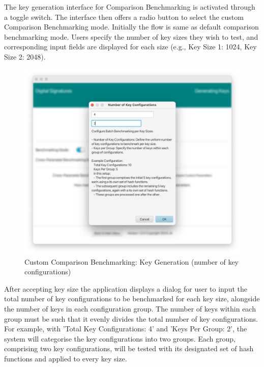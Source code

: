 \documentclass[]{final_report}
\begin{document}
The key generation interface for Comparison Benchmarking is activated through a toggle switch. The interface then offers a radio button to select the custom Comparison Benchmarking mode. Initially the flow is same as default comparison benchmarking mode. Users specify the number of key sizes they wish to test, and corresponding input fields are displayed for each size (e.g., Key Size 1: 1024, Key Size 2: 2048).


\begin{figure}[H]
    \centering
    \includegraphics[width=\textwidth]{main_pictures/ui/custom3.png}
    \caption{Custom Comparison Benchmarking: Key Generation (number of key configurations)}
\end{figure}

After accepting key size the application displays a dialog for user to input the total number of key configurations to be benchmarked for each key size, alongside the number of keys in each configuration group. The number of keys within each group must be such that it evenly divides the total number of key configurations. For example, with ’Total Key Configurations: 4’ and ’Keys Per Group: 2’, the system will categorise the key configurations into two groups. Each group, comprising two key configurations, will be tested with its designated set of hash functions and applied to every key size.
\end{document}
